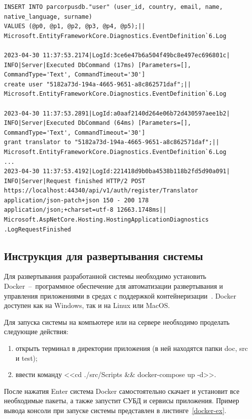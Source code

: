 \begin{lstlisting}[title={Окончание листинга \ref{reg-log}}, label=reg-log1, firstnumber=25]
INSERT INTO parcorpusdb."user" (user_id, country, email, name, native_language, surname)
VALUES (@p0, @p1, @p2, @p3, @p4, @p5);||
Microsoft.EntityFrameworkCore.Diagnostics.EventDefinition`6.Log

2023-04-30 11:37:53.2174|LogId:3ce6e47b6a504f49bc8e497ec696801c|
INFO|Server|Executed DbCommand (17ms) [Parameters=[], CommandType='Text', CommandTimeout='30']
create user "5182a73d-194a-4665-9651-a8c862571daf";||
Microsoft.EntityFrameworkCore.Diagnostics.EventDefinition`6.Log

2023-04-30 11:37:53.2891|LogId:a0aaf2140d264e06b72d430597aee1b2|
INFO|Server|Executed DbCommand (64ms) [Parameters=[], CommandType='Text', CommandTimeout='30']
grant translator to "5182a73d-194a-4665-9651-a8c862571daf";||
Microsoft.EntityFrameworkCore.Diagnostics.EventDefinition`6.Log
...
2023-04-30 11:37:53.4192|LogId:221418d9b0ba4538b118b2fd5d90a091|
INFO|Server|Request finished HTTP/2 POST https://localhost:44340/api/v1/auth/register/Translator application/json-patch+json 150 - 200 178 application/json;+charset=utf-8 12663.1748ms||
Microsoft.AspNetCore.Hosting.HostingApplicationDiagnostics
.LogRequestFinished
\end{lstlisting}

\subsection{Инструкция для развертывания системы}

Для развертывания разработанной системы необходимо установить \\Docker~--~программное обеспечение для автоматизации развертывания и управления приложениями в средах с поддержкой контейнеризации~\cite{docker}. 
Docker доступен как на Windows, так и на Linux или MacOS. 

Для запуска системы на компьютере или на сервере необходимо проделать следующие действия:

\begin{enumerate}
	\item открыть терминал в директории приложения (в ней находятся папки doc, src и test);
	
	\item ввести команду <<cd ./src/Scripts \&\& docker-compose up -d>>.
\end{enumerate}

После нажатия Enter система Docker самостоятельно скачает и установит все необходимые пакеты, а также запустит СУБД и сервисы приложения. 
Пример вывода консоли при запуске системы представлен в листинге~\ref{docker-ex}.

